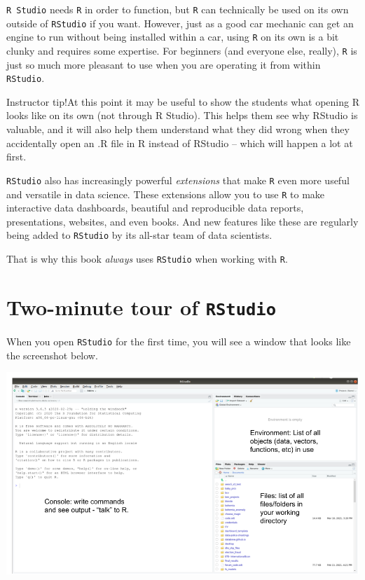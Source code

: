 \documentclass[
]{book}
\begin{document}
\texttt{R\ Studio} needs \texttt{R} in order to function, but \texttt{R} can technically be used on its own outside of \texttt{RStudio} if you want. However, just as a good car mechanic can get an engine to run without being installed within a car, using \texttt{R} on its own is a bit clunky and requires some expertise. For beginners (and everyone else, really), \texttt{R} is just so much more pleasant to use when you are operating it from within \texttt{RStudio}.

Instructor tip!At this point it may be useful to show the students what opening R looks like on its own (not through R Studio). This helps them see why RStudio is valuable, and it will also help them understand what they did wrong when they accidentally open an .R file in R instead of RStudio -- which will happen a lot at first.

\texttt{RStudio} also has increasingly powerful \emph{extensions} that make \texttt{R} even more useful and versatile in data science. These extensions allow you to use \texttt{R} to make interactive data dashboards, beautiful and reproducible data reports, presentations, websites, and even books. And new features like these are regularly being added to \texttt{RStudio} by its all-star team of data scientists.

That is why this book \emph{always} uses \texttt{RStudio} when working with \texttt{R}.

\hypertarget{two-minute-tour-of-rstudio}{%
\section*{\texorpdfstring{Two-minute tour of \texttt{RStudio}}{Two-minute tour of RStudio}}\label{two-minute-tour-of-rstudio}}

When you open \texttt{RStudio} for the first time, you will see a window that looks like the screenshot below.

\includegraphics{img/rstudio_windows.png}
\end{document}
